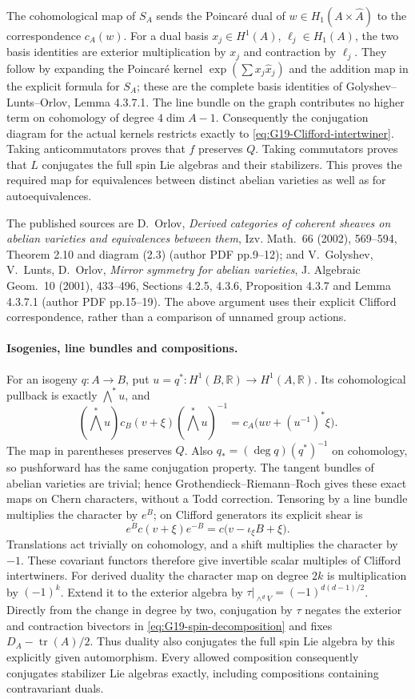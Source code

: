 The cohomological map of \(S_A\) sends the Poincar\'e dual of
\(w\in H_1(A\times\widehat A)\) to the correspondence \(c_A(w)\).
For a dual basis \(x_j\in H^1(A)\), \(\ell_j\in H_1(A)\),
the two basis identities are exterior multiplication by \(x_j\)
and contraction by \(\ell_j\). They follow by expanding the
Poincar\'e kernel \(\exp(\sum x_j\widehat x_j)\) and the addition
map in the explicit formula for \(S_A\); these are the complete
basis identities of Golyshev--Lunts--Orlov, Lemma 4.3.7.1.
The line bundle on the graph contributes no higher term on cohomology
of degree \(4\dim A-1\). Consequently the conjugation diagram for
the actual kernels restricts exactly to
\eqref{eq:G19-Clifford-intertwiner}. Taking anticommutators proves
that \(f\) preserves \(Q\). Taking commutators proves that \(L\)
conjugates the full spin Lie algebras and their stabilizers.
This proves the required map for equivalences between distinct abelian
varieties as well as for autoequivalences.

The published sources are D.\ Orlov, \emph{Derived categories of
coherent sheaves on abelian varieties and equivalences between them},
Izv. Math.\ 66 (2002), 569--594, Theorem 2.10 and diagram (2.3)
(author PDF pp.9--12); and V.\ Golyshev, V.\ Lunts, D.\ Orlov,
\emph{Mirror symmetry for abelian varieties}, J. Algebraic Geom.\ 10
(2001), 433--496, Sections 4.2.5, 4.3.6, Proposition 4.3.7 and
Lemma 4.3.7.1 (author PDF pp.15--19). The above argument uses their
explicit Clifford correspondence, rather than a comparison of unnamed
group actions.

\paragraph{Isogenies, line bundles and compositions.}
For an isogeny \(q:A\to B\), put \(u=q^*:H^1(B,\mathbb R)
\to H^1(A,\mathbb R)\). Its cohomological pullback is exactly
\(\bigwedge^*u\), and
\[
 (\bigwedge^*u)c_B(v+\xi)(\bigwedge^*u)^{-1}
          =c_A\bigl(uv+(u^{-1})^*\xi\bigr).
\]
The map in parentheses preserves \(Q\). Also
\(q_*=(\deg q)(q^*)^{-1}\) on cohomology, so pushforward has the
same conjugation property. The tangent bundles of abelian varieties
are trivial; hence Grothendieck--Riemann--Roch gives these exact maps
on Chern characters, without a Todd correction.
Tensoring by a line bundle multiplies the character by \(e^B\);
on Clifford generators its explicit shear is
\[
 e^Bc(v+\xi)e^{-B}=c\bigl(v-\iota_\xi B+\xi\bigr).
\]
Translations act trivially on cohomology, and a shift multiplies the
character by \(-1\). These covariant functors therefore give invertible
scalar multiples of Clifford intertwiners.
For derived duality the character map on degree \(2k\) is multiplication
by \((-1)^k\). Extend it to the exterior algebra by
\(\tau|_{\wedge^dV}=(-1)^{d(d-1)/2}\). Directly from the change
in degree by two, conjugation by \(\tau\) negates the exterior and
contraction bivectors in \eqref{eq:G19-spin-decomposition} and fixes
\(D_A-\operatorname{tr}(A)/2\). Thus duality also conjugates the
full spin Lie algebra by this explicitly given automorphism.
Every allowed composition consequently conjugates stabilizer Lie
algebras exactly, including compositions containing contravariant duals.

